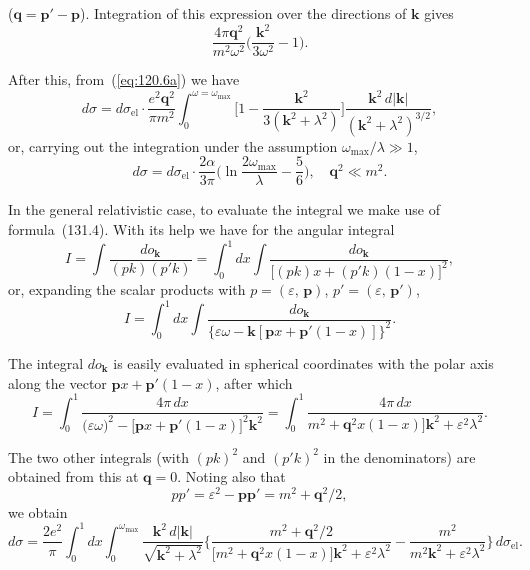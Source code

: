 
\noindent ($\mathbf{q} = \mathbf{p}' - \mathbf{p}$). Integration of this expression over the directions of $\mathbf{k}$ gives
\[
\frac{4\pi\mathbf{q}^2}{m^2\omega^2}\biggl(\frac{\mathbf{k}^2}{3\omega^2} - 1\biggr).
\]

After this, from~(\ref{eq:120.6a}) we have
\[
d\sigma = d\sigma_{\text{el}} \cdot \frac{e^2 \mathbf{q}^2}{\pi m^2} \int_0^{\omega = \omega_{\max}} \biggl[1 - \frac{\mathbf{k}^2}{3(\mathbf{k}^2 + \lambda^2)}\biggr] \frac{\mathbf{k}^2\,d|\mathbf{k}|}{(\mathbf{k}^2 + \lambda^2)^{3/2}},
\]
or, carrying out the integration under the assumption $\omega_{\max}/\lambda \gg 1$,
\begin{equation}
d\sigma = d\sigma_{\text{el}} \cdot \frac{2\alpha}{3\pi}\biggl(\ln\frac{2\omega_{\max}}{\lambda} - \frac{5}{6}\biggr), \quad \mathbf{q}^2 \ll m^2.
\label{eq:120.9}
\end{equation}

In the general relativistic case, to evaluate the integral we make use of formula~(131.4). With its help we have for the angular integral
\[
I = \int \frac{d o_\mathbf{k}}{(pk)(p'k)} = \int_0^1 dx \int \frac{d o_\mathbf{k}}{\bigl[(pk)x + (p'k)(1-x)\bigr]^2},
\]
or, expanding the scalar products with $p = (\varepsilon,\,\mathbf{p})$, $p' = (\varepsilon,\,\mathbf{p}')$,
\[
I = \int_0^1 dx \int \frac{d o_\mathbf{k}}{\bigl\{\varepsilon\omega - \mathbf{k}[\mathbf{p}x + \mathbf{p}'(1-x)]\bigr\}^2}.
\]

The integral $d o_\mathbf{k}$ is easily evaluated in spherical coordinates with the polar axis along the vector $\mathbf{p}x + \mathbf{p}'(1-x)$, after which
\[
I = \int_0^1 \frac{4\pi\,dx}{\bigl(\varepsilon\omega\bigr)^2 - \bigl[\mathbf{p}x + \mathbf{p}'(1-x)\bigr]^2 \mathbf{k}^2} = \int_0^1 \frac{4\pi\,dx}{m^2 + \mathbf{q}^2 x(1-x)\bigr]\mathbf{k}^2 + \varepsilon^2\lambda^2}.
\]

The two other integrals (with $(pk)^2$ and $(p'k)^2$ in the denominators) are obtained from this at $\mathbf{q} = 0$. Noting also that
\[
pp' = \varepsilon^2 - \mathbf{p}\mathbf{p}' = m^2 + \mathbf{q}^2/2,
\]
we obtain
\begin{equation}
d\sigma = \frac{2e^2}{\pi}\int_0^1 dx \int_0^{\omega_{\max}} \frac{\mathbf{k}^2\,d|\mathbf{k}|}{\sqrt{\mathbf{k}^2 + \lambda^2}} \biggl\{\frac{m^2 + \mathbf{q}^2/2}{\bigl[m^2 + \mathbf{q}^2 x(1-x)\bigr]\mathbf{k}^2 + \varepsilon^2\lambda^2} - \frac{m^2}{m^2\mathbf{k}^2 + \varepsilon^2\lambda^2}\biggr\}\,d\sigma_{\text{el}}.
\label{eq:120.10}
\end{equation}

